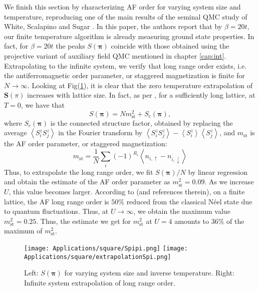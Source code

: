 \vspace{-0.5cm}
We finish this section by characterizing \ac{AF} order for varying system size and temperature, reproducing one of the main results of the seminal \ac{QMC} study of White, Scalapino and Sugar \cite{white_numerical_1989}.
In this paper, the authors report that by $\beta = 20 t$, our finite temperature algorithm is already measuring ground state properties.
In fact, for $\beta = 20 t$ the peaks $S ( \bm \pi )$ coincide with those obtained using the projective variant of auxiliary field \ac{QMC} mentioned in chapter \ref{cap:int}.
Extrapolating to the infinite system, we verify that long range order exists, i.e. the antiferromagnetic order parameter, or staggered magnetization is finite for $N \rightarrow \infty$.
Looking at Fig(\ref{fig:spipi}), it is clear that the zero temperature extrapolation of $\bm S (\pi)$ increases with lattice size.
In fact, as per \cite{hirsch_two-dimensional_1985}, for a sufficiently long lattice, at $T= 0$, we have that
\begin{equation}
S(\bm \pi) = N m_{\text{st}}^2 + S_c ( \bm \pi ) ,
\end{equation}
where $S_c ( \bm \pi )$ is the connected structure factor, obtained by replacing the average $\left\langle S^z_i S^z_j \right\rangle$ in the Fourier transform by $\left\langle S^z_i S^z_j \right\rangle - \left\langle S^z_i \right\rangle \left\langle S^z_j \right\rangle$, and $m_{\text{st}}$ is the \ac{AF} order parameter, or staggered magnetization:
\begin{equation}
m_{\text{st}} = \frac{1}{N} \sum_i (-1)^{R_i} \left\langle n_{i,\uparrow} - n_{i,\downarrow} \right\rangle
\end{equation}
Thus, to extrapolate the long range order, we fit $S ( \bm \pi ) / N$ by linear regression and obtain the estimate of the \ac{AF} order parameter as $m_{\text{st}}^2 = 0.09$.
As we increase $U$, this value becomes larger.
According to \cite{hirsch_two-dimensional_1985} (and references therein), on a finite lattice, the \ac{AF} long range order is $50 \%$ reduced from the classical Néel state due to quantum fluctuations.
Thus, at $U \rightarrow \infty$, we obtain the maximum value $m_{\text{st}}^2 = 0.25$.
Thus, the estimate we get for $m_{\text{st}}^2$  at $U=4$ amounts to $36\%$ of the maximum of $m_{\text{st}}^2$.
\vspace{-0.3cm}
\begin{figure}[H]
\texttt{[image: Applications/square/Spipi.png]}
\hspace{0.3cm}
\texttt{[image: Applications/square/extrapolationSpi.png]}
\caption[$S ( \bm \pi ) $ for varying system size and inverse temperature.
Infinite system extrapolation of long range order.]{Left: $S ( \bm \pi ) $ for varying system size and inverse temperature.
Right: Infinite system extrapolation of long range order. \label{fig:spipi} }
\end{figure}